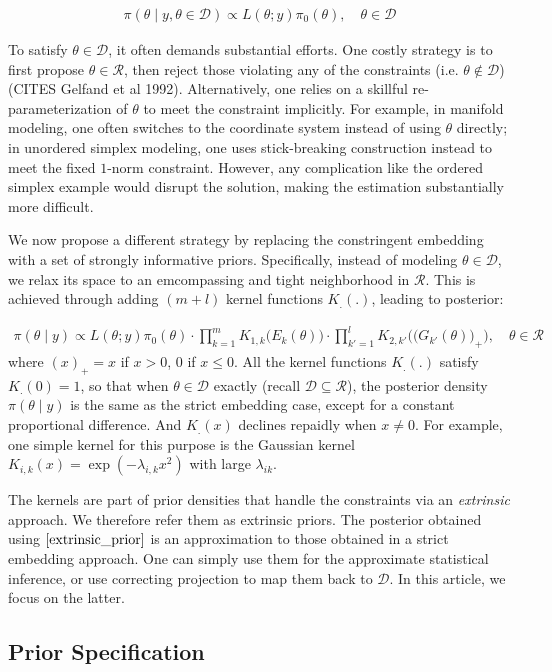 \documentclass[10pt]{article}
\newcommand{\be}{\begin{equation}\begin{aligned}}
\newcommand{\ee}{\end{aligned}\end{equation}}
\newcommand{\mc}[1]{\mathcal{#1}}
\begin{document}
\be
\pi(\theta \mid y, \theta \in \mc D) \propto  L(\theta;y)\pi_0 (\theta), \quad\theta\in \mc D
\ee

To satisfy $\theta \in \mc D$, it often demands substantial efforts. One costly strategy is to first propose $\theta\in \mc R$, then reject those violating any of the constraints (i.e. $\theta \not\in \mc D$) (CITES Gelfand et al 1992). Alternatively, one relies on a skillful re-parameterization of $\theta$ to meet the constraint implicitly. For example, in manifold modeling, one often switches to the coordinate system instead of using $\theta$ directly; in unordered simplex modeling, one uses stick-breaking construction instead to meet the fixed $1$-norm constraint. However, any complication like the ordered simplex example would disrupt the solution, making the estimation substantially more difficult.

We now propose a different strategy by replacing the constringent embedding with a set of strongly informative priors. Specifically, instead of modeling $\theta \in \mc D$, we relax its space to an emcompassing and tight neighborhood in $\mc R$. This is achieved through adding $(m+l)$ kernel functions $K_.(.)$, leading to posterior: 


\be
\label{extrinsic_prior}
\pi(\theta \mid y) \propto L(\theta;y)\pi_0(\theta) \cdot \prod_{k=1}^{m} K_{1,k}\Big( E_k(\theta) \Big) \cdot \prod_{k'=1}^{l} K_{2,k'}\Big( \big( G_{k'}(\theta) \big)_+ \Big), \quad \theta \in \mc R
\ee
where $(x)_+ = x$ if $x>0$, $0$ if $x\le 0$. All the kernel functions $K_{.}(.)$ satisfy $K_{.}(0)=1$, so that when $\theta \in \mc D$ exactly (recall $\mc D \subseteq \mc R$), the posterior density $\pi(\theta\mid y)$ is the same as the strict embedding case, except for a constant proportional difference. And $K_.(x)$ declines repaidly when $x\ne 0$. For example, one simple kernel for this purpose is the Gaussian kernel $K_{i,k}(x) = \exp( -{\lambda_{i,k} x^2})$ with large $\lambda_{ik}$.

The kernels are part of prior densities that handle the constraints via an {\it extrinsic} approach. We therefore refer them as extrinsic priors. The posterior obtained using $\eqref{extrinsic_prior}$ is an approximation to those obtained in a strict embedding approach. One can simply use them for the approximate statistical inference, or use correcting projection to map them back to $\mc D$. In this article, we focus on the latter.


\subsection{Prior Specification}
\end{document}
